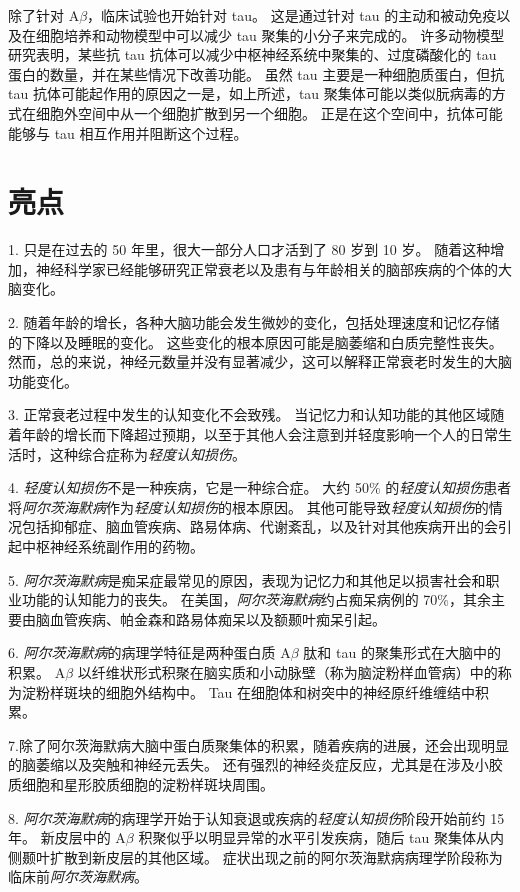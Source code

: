 除了针对 A$\beta$，临床试验也开始针对 tau。
这是通过针对 tau 的主动和被动免疫以及在细胞培养和动物模型中可以减少 tau 聚集的小分子来完成的。
许多动物模型研究表明，某些抗 tau 抗体可以减少中枢神经系统中聚集的、过度磷酸化的 tau 蛋白的数量，并在某些情况下改善功能。
虽然 tau 主要是一种细胞质蛋白，但抗 tau 抗体可能起作用的原因之一是，如上所述，tau 聚集体可能以类似朊病毒的方式在细胞外空间中从一个细胞扩散到另一个细胞。
正是在这个空间中，抗体可能能够与 tau 相互作用并阻断这个过程。



\section{亮点}

1. 只是在过去的 50 年里，很大一部分人口才活到了 80 岁到 10 岁。
随着这种增加，神经科学家已经能够研究正常衰老以及患有与年龄相关的脑部疾病的个体的大脑变化。


2. 随着年龄的增长，各种大脑功能会发生微妙的变化，包括处理速度和记忆存储的下降以及睡眠的变化。
这些变化的根本原因可能是脑萎缩和白质完整性丧失。
然而，总的来说，神经元数量并没有显著减少，这可以解释正常衰老时发生的大脑功能变化。


3. 正常衰老过程中发生的认知变化不会致残。
当记忆力和认知功能的其他区域随着年龄的增长而下降超过预期，以至于其他人会注意到并轻度影响一个人的日常生活时，这种综合症称为\textit{轻度认知损伤}。


4. \textit{轻度认知损伤}不是一种疾病，它是一种综合症。
大约 50\% 的\textit{轻度认知损伤}患者将\textit{阿尔茨海默病}作为\textit{轻度认知损伤}的根本原因。
其他可能导致\textit{轻度认知损伤}的情况包括抑郁症、脑血管疾病、路易体病、代谢紊乱，以及针对其他疾病开出的会引起中枢神经系统副作用的药物。


5. \textit{阿尔茨海默病}是痴呆症最常见的原因，表现为记忆力和其他足以损害社会和职业功能的认知能力的丧失。
在美国，\textit{阿尔茨海默病}约占痴呆病例的 70\%，其余主要由脑血管疾病、帕金森和路易体痴呆以及额颞叶痴呆引起。


6. \textit{阿尔茨海默病}的病理学特征是两种蛋白质 A$\beta$ 肽和 tau 的聚集形式在大脑中的积累。
A$\beta$ 以纤维状形式积聚在脑实质和小动脉壁（称为脑淀粉样血管病）中的称为淀粉样斑块的细胞外结构中。
Tau 在细胞体和树突中的神经原纤维缠结中积累。


7.除了阿尔茨海默病大脑中蛋白质聚集体的积累，随着疾病的进展，还会出现明显的脑萎缩以及突触和神经元丢失。
还有强烈的神经炎症反应，尤其是在涉及小胶质细胞和星形胶质细胞的淀粉样斑块周围。


8. \textit{阿尔茨海默病}的病理学开始于认知衰退或疾病的\textit{轻度认知损伤}阶段开始前约 15 年。
新皮层中的 A$\beta$ 积聚似乎以明显异常的水平引发疾病，随后 tau 聚集体从内侧颞叶扩散到新皮层的其他区域。
症状出现之前的阿尔茨海默病病理学阶段称为临床前\textit{阿尔茨海默病}。


